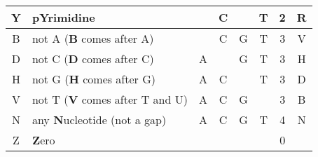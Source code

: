 \begin{table}[htbp]
{\begin{center}
\begin{tabular}{c|l|cccc|c|c}
    Y & p\textbf{Y}rimidine &  & \rb{} C &  & \rb{} T & 2 & R \\
    \hline
    B & not A (\textbf{B} comes after A) &  & \rb{} C & \rb{} G & \rb{} T & 3 & V \\
    D & not C (\textbf{D} comes after C) & \rb{} A &  & \rb{} G & \rb{} T & 3 & H \\
    H & not G (\textbf{H} comes after G) & \rb{} A & \rb{} C &  & \rb{} T & 3 & D \\
    V & not T (\textbf{V} comes after T and U) & \rb{} A & \rb{} C & \rb{} G &  & 3 & B \\
    \hline
    N & any \textbf{N}ucleotide (not a gap) & \rb{} A & \rb{} C & \rb{} G & \rb{} T & 4 & N \\
    Z & \textbf{Z}ero &  &  &  &  & 0 & \\
    \end{tabular}
    \end{center}
}
\end{table}

